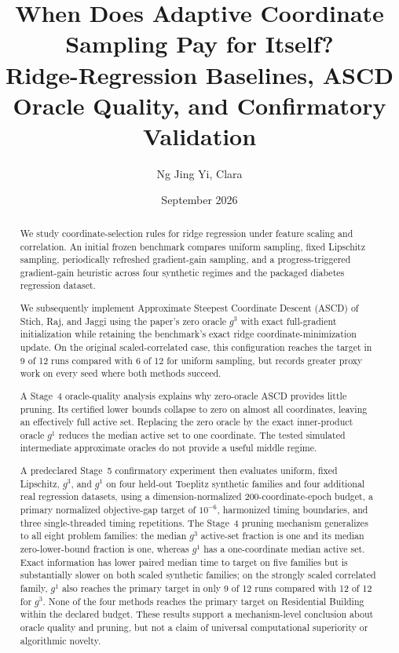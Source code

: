 \documentclass[11pt]{article}
\title{
    \textbf{When Does Adaptive Coordinate Sampling Pay for Itself?}\\
    \large Ridge-Regression Baselines, ASCD Oracle Quality,
    and Confirmatory Validation
}
\author{Ng Jing Yi, Clara}
\date{September 2026}
\begin{document}
\maketitle

\begin{abstract}
We study coordinate-selection rules for ridge regression under feature
scaling and correlation. An initial frozen benchmark compares uniform
sampling, fixed Lipschitz sampling, periodically refreshed gradient-gain
sampling, and a progress-triggered gradient-gain heuristic across four
synthetic regimes and the packaged diabetes regression dataset.

We subsequently implement Approximate Steepest Coordinate Descent
(ASCD) of Stich, Raj, and Jaggi using the paper's zero oracle
$g^3$ with exact full-gradient initialization while retaining the
benchmark's exact ridge coordinate-minimization update. On the original
scaled-correlated case, this configuration reaches the target in 9 of
12 runs compared with 6 of 12 for uniform sampling, but records greater
proxy work on every seed where both methods succeed.

A Stage~4 oracle-quality analysis explains why zero-oracle ASCD provides
little pruning. Its certified lower bounds collapse to zero on almost
all coordinates, leaving an effectively full active set. Replacing the
zero oracle by the exact inner-product oracle $g^1$ reduces the median
active set to one coordinate. The tested simulated intermediate
approximate oracles do not provide a useful middle regime.

A predeclared Stage~5 confirmatory experiment then evaluates uniform,
fixed Lipschitz, $g^3$, and $g^1$ on four held-out Toeplitz synthetic
families and four additional real regression datasets, using a
dimension-normalized 200-coordinate-epoch budget, a primary normalized
objective-gap target of $10^{-6}$, harmonized timing boundaries, and
three single-threaded timing repetitions. The Stage~4 pruning mechanism
generalizes to all eight problem families: the median $g^3$ active-set
fraction is one and its median zero-lower-bound fraction is one, whereas
$g^1$ has a one-coordinate median active set. Exact information has
lower paired median time to target on five families but is substantially
slower on both scaled synthetic families; on the strongly scaled
correlated family, $g^1$ also reaches the primary target in only 9 of
12 runs compared with 12 of 12 for $g^3$. None of the four methods
reaches the primary target on Residential Building within the declared
budget. These results support a mechanism-level conclusion about oracle
quality and pruning, but not a claim of universal computational
superiority or algorithmic novelty.
\end{abstract}
\end{document}
